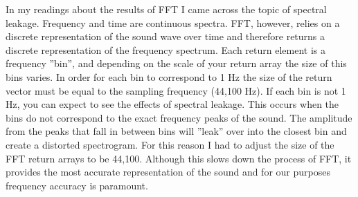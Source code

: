 In my readings about the results of FFT I came across the topic of spectral leakage.
Frequency and time are continuous spectra.
FFT, however, relies on a discrete representation of the sound wave over time and therefore returns a discrete representation of the frequency spectrum.
Each return element is a frequency ”bin”, and depending on the scale of your return array the size of this bins varies.
In order for each bin to correspond to 1 Hz the size of the return vector must be equal to the sampling frequency (44,100 Hz).
If each bin is not 1 Hz, you can expect to see the effects of spectral leakage.
This occurs when the bins do not correspond to the exact frequency peaks of the sound.
The amplitude from the peaks that fall in between bins will ”leak” over into the closest bin and create a distorted spectrogram.
For this reason I had to adjust the size of the FFT return arrays to be 44,100.
Although this slows down the process of FFT, it provides the most accurate representation of the sound and for our purposes frequency accuracy is paramount.


